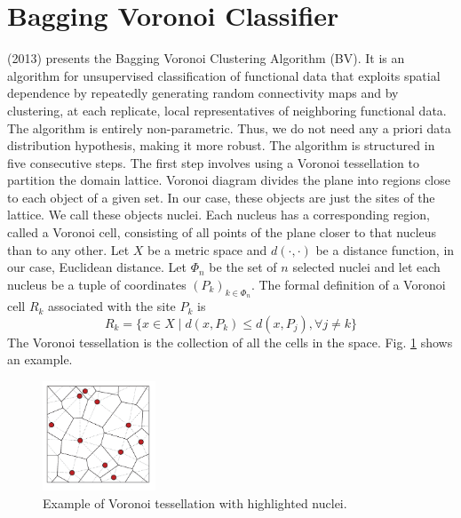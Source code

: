 \section{Bagging Voronoi Classifier}
\label{sec:bvc}
\citeauthor{secchi_bagging_2013} (2013) presents the Bagging Voronoi Clustering Algorithm (BV). It is an algorithm for unsupervised classification of functional data that exploits spatial dependence by repeatedly generating random connectivity maps and by clustering, at each replicate, local representatives of neighboring functional data. The algorithm is entirely non-parametric. Thus, we do not need any a priori data distribution hypothesis, making it more robust. The algorithm is structured in five consecutive steps. The first step involves using a Voronoi tessellation to partition the domain lattice. Voronoi diagram divides the plane into regions close to each object of a given set. In our case, these objects are just the sites of the lattice. We call these objects nuclei. Each nucleus has a corresponding region, called a Voronoi cell, consisting of all points of the plane closer to that nucleus than to any other. Let $X$ be a metric space and $d(\cdot, \cdot)$ be a distance function, in our case, Euclidean distance. Let $\Phi_n$ be the set of $n$ selected nuclei and let each nucleus be a tuple of coordinates $\left(P_k\right)_{k\in \Phi_n}$. The formal definition of a Voronoi cell $R_k$ associated with the site $P_k$ is 
\begin{equation}
    \label{eq:voronoicell}
    R_k=\{x\in X \mid d(x, P_k)\leq d(x, P_j),\forall j\neq k\}
\end{equation}
The Voronoi tessellation is the collection of all the cells in the space.
Fig. \ref{fig:voronoi} shows an example.
\begin{figure}
    \centering
    \includegraphics[width=0.3\textwidth]{Images/A-set-of-atoms-the-associated-Voronoi-tessellation-solid-lines-and-the-Delaunay.png}
    \caption[Voronoi tessellation.]{Example of Voronoi tessellation with highlighted nuclei.}
    \label{fig:voronoi}
\end{figure}
